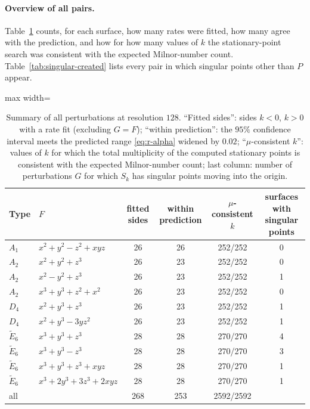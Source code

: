 \documentclass[12pt, a4paper]{article}
\theoremstyle{plain}
\theoremstyle{definition}
\theoremstyle{remark}
\theoremstyle{definition}
\begin{document}
\paragraph{Overview of all pairs.} Table~\ref{tab:summary} counts, for each
surface, how many rates were fitted, how many agree with the prediction, and how
for how many values of $k$ the stationary-point search was consistent with the expected Milnor-number count. Table~\ref{tab:singular-created}
lists every pair in which singular points other than $P$ appear.

\begin{table}[!h]
\centering
\small
\begin{adjustbox}{max width=\textwidth}
\begin{tabular}{l l c c c c}
\toprule
Type & $F$ & fitted sides & within prediction & $\mu$-consistent $k$ & surfaces with singular points \\
\midrule
$A_1$ & $x^2+y^2-z^2+xyz$ & 26 & 26 & 252/252 & 0 \\
$A_2$ & $x^2+y^2+z^3$ & 26 & 23 & 252/252 & 0 \\
$A_2$ & $x^2-y^2+z^3$ & 26 & 23 & 252/252 & 1 \\
$A_2$ & $x^3+y^3+z^2+x^2$ & 26 & 23 & 252/252 & 0 \\
$D_4$ & $x^2+y^3+z^3$ & 26 & 23 & 252/252 & 1 \\
$D_4$ & $x^2+y^3-3yz^2$ & 26 & 23 & 252/252 & 1 \\
$\tilde E_6$ & $x^3+y^3+z^3$ & 28 & 28 & 270/270 & 4 \\
$\tilde E_6$ & $x^3+y^3-z^3$ & 28 & 28 & 270/270 & 3 \\
$\tilde E_6$ & $x^3+y^3+z^3+xyz$ & 28 & 28 & 270/270 & 1 \\
$\tilde E_6$ & $x^3+2y^3+3z^3+2xyz$ & 28 & 28 & 270/270 & 1 \\
\midrule
all & & 268 & 253 & 2592/2592 & \\
\bottomrule
\end{tabular}
\end{adjustbox}
\caption[Summary of all experiments]{Summary of all perturbations at resolution $128$. ``Fitted sides'': sides $k<0$, $k>0$ with a rate fit (excluding $G=F$); ``within prediction'': the $95\%$ confidence interval meets the predicted range \eqref{eq:r-alpha} widened by $0.02$; ``$\mu$-consistent $k$'': values of $k$ for which the total multiplicity of the computed stationary points is consistent with the expected Milnor-number count; last column: number of perturbations $G$ for which $S_k$ has singular points moving into the origin.}
\label{tab:summary}
\end{table}
\end{document}
